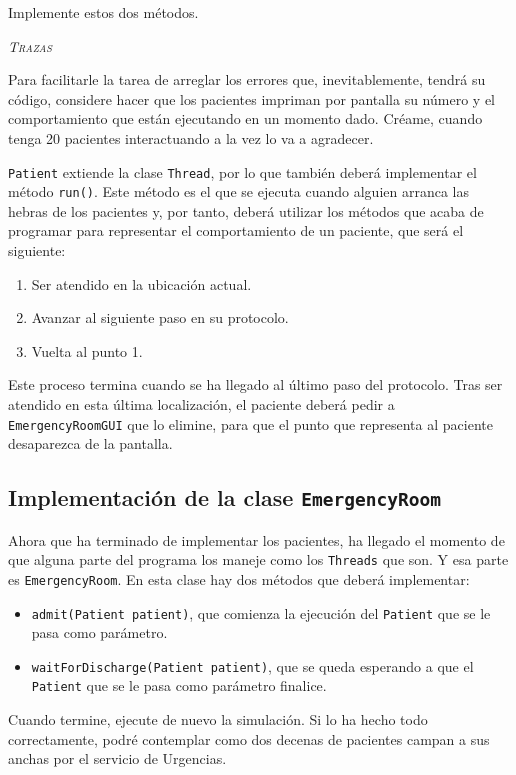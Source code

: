 \documentclass[10pt,a4paper,spanish]{article}
\newcommand{\sombreado}[2]{
  \begin{shaded}
    \begin{center} \emph{\textsc{#1}} \end{center}
    \noindent #2\\
  \end{shaded}
}
\newcommand{\code}[1]{\texttt{#1}}
\begin{document}
Implemente estos dos métodos.

\sombreado{Trazas}{Para facilitarle la tarea de arreglar los errores que, inevitablemente, tendrá su código, considere hacer que los pacientes impriman por pantalla su número y el comportamiento que están ejecutando en un momento dado. Créame, cuando tenga 20 pacientes interactuando a la vez lo va a agradecer.}

\code{Patient} extiende la clase \code{Thread}, por lo que también deberá implementar el método \code{run()}. Este método es el que se ejecuta cuando alguien arranca las hebras de los pacientes y, por tanto, deberá utilizar los métodos que acaba de programar para representar el comportamiento de un paciente, que será el siguiente:

\begin{enumerate}
    \item Ser atendido en la ubicación actual.
    \item Avanzar al siguiente paso en su protocolo.
    \item Vuelta al punto 1.
\end{enumerate}

Este proceso termina cuando se ha llegado al último paso del protocolo. Tras ser atendido en esta última localización, el paciente deberá pedir a \code{EmergencyRoomGUI} que lo elimine, para que el punto que representa al paciente desaparezca de la pantalla.

\subsection{Implementación de la clase \code{EmergencyRoom}}

Ahora que ha terminado de implementar los pacientes, ha llegado el momento de que alguna parte del programa los maneje como los \code{Threads} que son. Y esa parte es \code{EmergencyRoom}. En esta clase hay dos métodos que deberá implementar:

\begin{itemize}
    \item \code{admit(Patient patient)}, que comienza la ejecución del \code{Patient} que se le pasa como parámetro.
    \item \code{waitForDischarge(Patient patient)}, que se queda esperando a que el \code{Patient} que se le pasa como parámetro finalice.
\end{itemize}

Cuando termine, ejecute de nuevo la simulación. Si lo ha hecho todo correctamente, podré contemplar como dos decenas de pacientes campan a sus anchas por el servicio de Urgencias.
\end{document}
